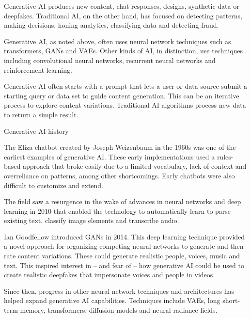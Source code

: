 Generative AI produces new content, chat responses, designs, synthetic data or deepfakes. Traditional AI, on the other hand, has focused on detecting patterns, making decisions, honing analytics, classifying data and detecting fraud.

Generative AI, as noted above, often uses neural network techniques such as transformers, GANs and VAEs. Other kinds of AI, in distinction, use techniques including convolutional neural networks, recurrent neural networks and reinforcement learning.

Generative AI often starts with a prompt that lets a user or data source submit a starting query or data set to guide content generation. This can be an iterative process to explore content variations. Traditional AI algorithms process new data to return a simple result.


Generative AI history

The Eliza chatbot created by Joseph Weizenbaum in the 1960s was one of the earliest examples of generative AI. These early implementations used a rules-based approach that broke easily due to a limited vocabulary, lack of context and overreliance on patterns, among other shortcomings. Early chatbots were also difficult to customize and extend.

The field saw a resurgence in the wake of advances in neural networks and deep learning in 2010 that enabled the technology to automatically learn to parse existing text, classify image elements and transcribe audio.

Ian Goodfellow introduced GANs in 2014. This deep learning technique provided a novel approach for organizing competing neural networks to generate and then rate content variations. These could generate realistic people, voices, music and text. This inspired interest in -- and fear of -- how generative AI could be used to create realistic deepfakes that impersonate voices and people in videos.

Since then, progress in other neural network techniques and architectures has helped expand generative AI capabilities. Techniques include VAEs, long short-term memory, transformers, diffusion models and neural radiance fields.